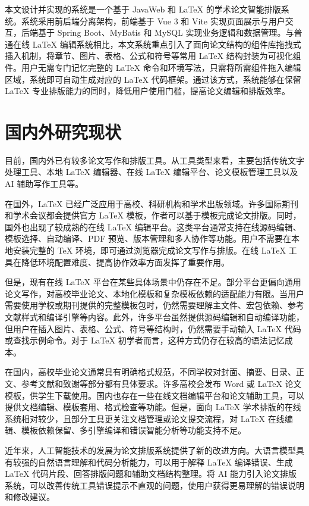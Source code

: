 \documentclass{xduugthesis}
\begin{document}
本文设计并实现的系统是一个基于 JavaWeb 和 LaTeX 的学术论文智能排版系统。系统采用前后端分离架构，前端基于 Vue 3 和 Vite 实现页面展示与用户交互，后端基于 Spring Boot、MyBatis 和 MySQL 实现业务逻辑和数据管理。与普通在线 LaTeX 编辑系统相比，本文系统重点引入了面向论文结构的组件库拖拽式插入机制，将章节、图片、表格、公式和符号等常用 LaTeX 结构封装为可视化组件。用户无需专门记忆完整的 LaTeX 命令和环境写法，只需将所需组件拖入编辑区域，系统即可自动生成对应的 LaTeX 代码框架。通过该方式，系统能够在保留 LaTeX 专业排版能力的同时，降低用户使用门槛，提高论文编辑和排版效率。

\section{国内外研究现状}
目前，国内外已有较多论文写作和排版工具。从工具类型来看，主要包括传统文字处理工具、本地 LaTeX 编辑器、在线 LaTeX 编辑平台、论文模板管理工具以及 AI 辅助写作工具等\cite{huang2018lyx}。

在国外，LaTeX 已经广泛应用于高校、科研机构和学术出版领域\cite{bahls2015latexnics}。许多国际期刊和学术会议都会提供官方 LaTeX 模板，作者可以基于模板完成论文排版。同时，国外也出现了较成熟的在线 LaTeX 编辑平台。这类平台通常支持在线源码编辑、模板选择、自动编译、PDF 预览、版本管理和多人协作等功能\cite{zhang2013onlinepaper}。用户不需要在本地安装完整的 TeX 环境，即可通过浏览器完成论文写作与排版。在线 LaTeX 工具在降低环境配置难度、提高协作效率方面发挥了重要作用。

但是，现有在线 LaTeX 平台在某些具体场景中仍存在不足。部分平台更偏向通用论文写作，对高校毕业论文、本地化模板和复杂模板依赖的适配能力有限。当用户需要使用学校或期刊提供的完整模板包时，仍然需要理解主文件、宏包依赖、参考文献样式和编译引擎等内容。此外，许多平台虽然提供源码编辑和自动编译功能，但用户在插入图片、表格、公式、符号等结构时，仍然需要手动输入 LaTeX 代码或查找示例命令。对于 LaTeX 初学者而言，这种方式仍存在较高的语法记忆成本。

在国内，高校毕业论文通常具有明确格式规范，不同学校对封面、摘要、目录、正文、参考文献和致谢等部分都有具体要求\cite{sun2022latexthesis}。许多高校会发布 Word 或 LaTeX 论文模板，供学生下载使用\cite{zhao2013latexxinjiang}。国内也存在一些在线文档编辑平台和论文辅助工具，可以提供文档编辑、模板套用、格式检查等功能。但是，面向 LaTeX 学术排版的在线系统相对较少，且部分工具更关注文档管理或论文提交流程，对 LaTeX 在线编辑、模板依赖保留、多引擎编译和错误智能分析等功能支持不足。

近年来，人工智能技术的发展为论文排版系统提供了新的改进方向。大语言模型具有较强的自然语言理解和代码分析能力，可以用于解释 LaTeX 编译错误、生成 LaTeX 代码片段、回答排版问题和辅助文档结构整理。将 AI 能力引入论文排版系统，可以改善传统工具错误提示不直观的问题，使用户获得更易理解的错误说明和修改建议。
\end{document}
